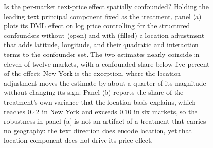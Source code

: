 \begin{figure}[!htbp]
\caption{Is the per-market text-price effect spatially confounded? Holding the
leading text principal component fixed as the treatment, panel (a) plots its DML
effect on log price controlling for the structured confounders without (open) and
with (filled) a location adjustment that adds latitude, longitude, and their
quadratic and interaction terms to the confounder set. The two estimates nearly
coincide in eleven of twelve markets, with a confounded share below five percent
of the effect; New York is the exception, where the location adjustment moves the
estimate by about a quarter of its magnitude without changing its sign. Panel (b)
reports the share of the treatment's own variance that the location basis
explains, which reaches $0.42$ in New York and exceeds $0.10$ in six markets, so
the robustness in panel (a) is not an artifact of a treatment that carries no
geography: the text direction does encode location, yet that location component
does not drive its price effect.}
\label{fig:decomposition}
\end{figure}
